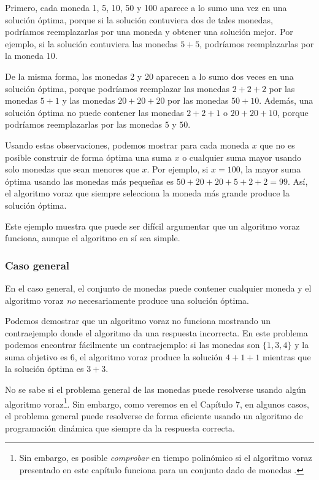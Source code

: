 Primero, cada moneda 1, 5, 10, 50 y 100 aparece
a lo sumo una vez en una solución óptima,
porque si la
solución contuviera dos de tales monedas,
podríamos reemplazarlas por una moneda y
obtener una solución mejor.
Por ejemplo, si la solución contuviera
las monedas $5+5$, podríamos reemplazarlas por la moneda $10$.

De la misma forma, las monedas 2 y 20 aparecen
a lo sumo dos veces en una solución óptima,
porque podríamos reemplazar
las monedas $2+2+2$ por las monedas $5+1$ y
las monedas $20+20+20$ por las monedas $50+10$.
Además, una solución óptima no puede contener
las monedas $2+2+1$ o $20+20+10$,
porque podríamos reemplazarlas por las monedas $5$ y $50$.

Usando estas observaciones,
podemos mostrar para cada moneda $x$ que
no es posible construir de forma óptima
una suma $x$ o cualquier suma mayor usando solo monedas
que sean menores que $x$.
Por ejemplo, si $x=100$, la mayor suma óptima
usando las monedas más pequeñas es $50+20+20+5+2+2=99$.
Así, el algoritmo voraz que siempre selecciona
la moneda más grande produce la solución óptima.

Este ejemplo muestra que puede ser difícil
argumentar que un algoritmo voraz funciona,
aunque el algoritmo en sí sea simple.

\subsubsection{Caso general}

En el caso general, el conjunto de monedas puede contener cualquier moneda
y el algoritmo voraz \emph{no} necesariamente produce
una solución óptima.

Podemos demostrar que un algoritmo voraz no funciona
mostrando un contraejemplo
donde el algoritmo da una respuesta incorrecta.
En este problema podemos encontrar fácilmente un contraejemplo:
si las monedas son $\{1,3,4\}$ y la suma objetivo
es 6, el algoritmo voraz produce la solución
$4+1+1$ mientras que la solución óptima es $3+3$.

No se sabe si el problema general de las monedas
puede resolverse usando algún algoritmo voraz\footnote{Sin embargo, es posible
\emph{comprobar} en tiempo polinómico
si el algoritmo voraz presentado en este capítulo funciona para
un conjunto dado de monedas \cite{pea05}.}.
Sin embargo, como veremos en el Capítulo 7,
en algunos casos,
el problema general puede resolverse
de forma eficiente usando un algoritmo de programación
dinámica que siempre da la
respuesta correcta.

